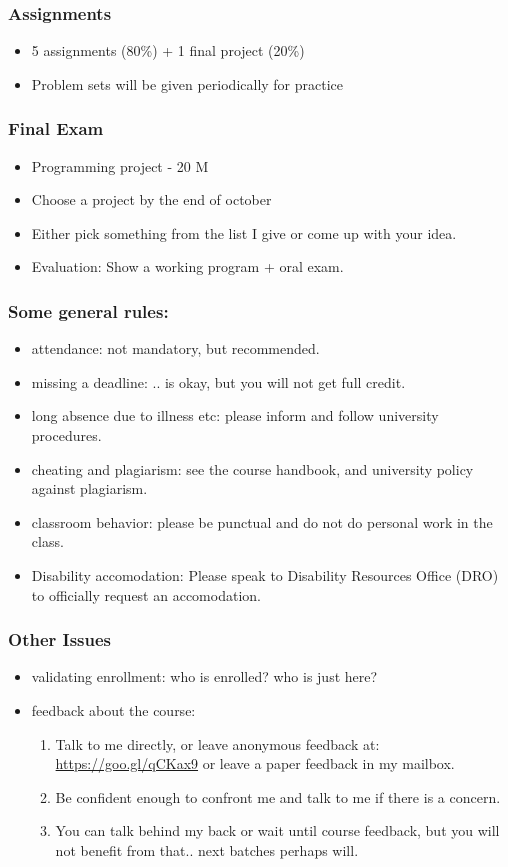 \documentclass{beamer}
\begin{document}
\begin{frame}
\frametitle{Assignments}
\begin{itemize}
\item 5 assignments (80\%) + 1 final project (20\%)
\item Problem sets will be given periodically for practice
\end{itemize}
\end{frame}

\begin{frame}
\frametitle{Final Exam}
\begin{itemize}
\item Programming project - 20 M
\item Choose a project by the end of october
\item Either pick something from the list I give or come up with your idea.
\item Evaluation: Show a working program + oral exam.
\end{itemize}
\end{frame}

\begin{frame}
\frametitle{Some general rules:}
\begin{itemize}
\item attendance: not mandatory, but recommended.
\item missing a deadline: .. is okay, but you will not get full credit.
\item long absence due to illness etc: please inform and follow university procedures.
\item cheating and plagiarism: see the course handbook, and university policy against plagiarism.
\item classroom behavior: please be punctual and do not do personal work in the class.
\item Disability accomodation: Please speak to Disability Resources Office (DRO) to officially request an accomodation.
\end{itemize}
\end{frame}

\begin{frame}
\frametitle{Other Issues}
\begin{itemize}
\item validating enrollment: who is enrolled? who is just here?
\item feedback about the course: 
\begin{enumerate}
\item Talk to me directly, or leave anonymous feedback at: \url{https://goo.gl/qCKax9} or leave a paper feedback in my mailbox. 
\item Be confident enough to confront me and talk to me if there is a concern. 
\item You can talk behind my back or wait until course feedback, but you will not benefit from that.. next batches perhaps will. 
\end{enumerate}
\end{itemize}
\end{frame}
\end{document}
